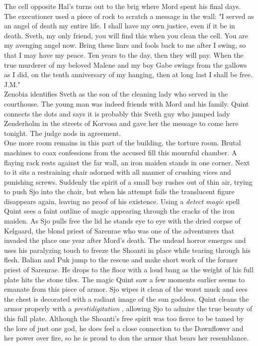 The cell opposite Hal's turns out to the brig where Mord spent his final days. The executioner used a piece of rock to scratch a message in the wall: "I served as an angel of death my entire life. I shall have my own justice, even if it be in death. Sveth, my only friend, you will find this when you clean the cell. You are my avenging angel now. Bring these liars and fools back to me after I swing, so that I may have my peace. Ten years to the day, then they will pay. When the true murderer of my beloved Malene and my boy Gabe swings from the gallows as I did, on the tenth anniversary of my hanging, then at long last I shall be free. J.M."\\

Zenobia identifies Sveth as the son of the cleaning lady who served in the courthouse. The young man was indeed friends with Mord and his family. Quint connects the dots and says it is probably this Sveth guy who jumped lady Zenderholm in the streets of Korvosa and gave her the message to come here tonight. The judge nods in agreement.\\

One more room remains in this part of the building, the torture room. Brutal machines to coax confessions from the accused fill this mournful chamber. A flaying rack rests against the far wall, an iron maiden stands in one corner. Next to it sits a restraining chair adorned with all manner of crushing vices and punishing screws. Suddenly the spirit of a small boy rushes out of thin air, trying to push Sjo into the chair, but when his attempt fails the translucent figure disappears again, leaving no proof of his existence. Using a {\itshape detect magic} spell Quint sees a faint outline of magic appearing through the cracks of the iron maiden. As Sjo pulls free the lid he stands eye to eye with the dried corpse of Kelgaard, the blond priest of Sarenrae who was one of the adventurers that invaded the place one year after Mord's death. The undead horror emerges and uses his paralyzing touch to freeze the Shoanti in place while tearing through his flesh. Balian and Puk jump to the rescue and make short work of the former priest of Sarenrae. He drops to the floor with a loud bang as the weight of his full plate hits the stone tiles. The magic Quint saw a few moments earlier seems to emanate from this piece of armor. Sjo wipes it clean of the worst muck and sees the chest is decorated with a radiant image of the sun goddess. Quint cleans the armor properly with a  {\itshape prestidigitation} , allowing Sjo to admire the true beauty of this full plate. Although the Shoanti's free spirit was too fierce to be tamed by the lore of just one god, he does feel a close connection to the Dawnflower and her power over fire, so he is proud to don the armor that bears her resemblance. 